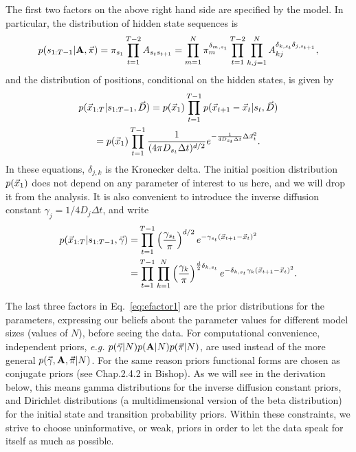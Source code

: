 The first two factors on the above right hand side are specified by
the model. In particular, the distribution of hidden state sequences
is
\begin{equation}\label{smodel1}
  p(s_{1:T-1}|\mathbf{A},\vec{\pi})=\pi_{s_1}\prod_{t=1}^{T-2}A_{s_ts_{t+1}}
  =\prod_{m=1}^N\pi_m^{\delta_{m,s_1}}
  \prod_{t=1}^{T-2}\prod_{k,j=1}^N A_{kj}^{\delta_{k,s_t}\delta_{j,s_{t+1}}},
\end{equation}
and the distribution of positions, conditional on the hidden states, is
given by 
\begin{multline}
  p(\vec{x}_{1:T}|s_{1:T-1},\vec
  D)=p(\vec{x}_1)\prod_{t=1}^{T-1}p(\vec{x}_{t+1}-\vec{x}_t|s_t,\vec D)\\
  =p(\vec{x}_1)\prod_{t=1}^{T-1} \frac{1}{(4\pi D_{s_t}\Delta
  t)^{d/2}}e^{-\frac{1}{4D_{s_t}\Delta t}\Delta\vec{x}_t^2}.
\end{multline}
In these equations, $\delta_{j,k}$ is the Kronecker delta. The initial
position distribution $p(\vec{x}_1)$ does not depend on any parameter of
interest to us here, and we will drop it from the analysis.  It is
also convenient to introduce the inverse diffusion constant
$\gamma_j=1/4D_j\Delta t$, and write
\begin{align}
    p(\vec{x}_{1:T}|s_{1:T-1},\vec\gamma)=&
    \prod_{t=1}^{T-1}\left(\frac{\gamma_{s_t}}{\pi}\right)^{d/2}
    e^{-\gamma_{s_t}(\vec{x}_{t+1}-\vec{x}_t)^2}\nonumber\\
    =&\prod_{t=1}^{T-1}\prod_{k=1}^N\left(
    \frac{\gamma_k}{\pi}\right)^{\frac d2\delta_{k,s_t}}
    e^{-\delta_{k,s_t}\gamma_k(\vec{x}_{t+1}-\vec{x}_t)^2}. 
    \label{xmodel1}
\end{align}

The last three factors in Eq.~\eqref{eq:efactor1} are the prior
distributions for the parameters, expressing our beliefs about the
parameter values for different model sizes (values of $N$), before
seeing the data. For computational convenience, independent
priors, \textit{e.g.}  $p(\vec{\gamma}|N) p(\mathbf{A}|N)
p(\vec\pi|N)$, are used instead of the more general
$p(\vec{\gamma},\mathbf{A},\vec\pi|N)$. For the same reason priors
functional forms are chosen as conjugate priors (see Chap.2.4.2 in
Bishop\cite{Bishop2006}). As we will see in the derivation below, this
means gamma distributions for the inverse diffusion constant priors,
and Dirichlet distributions (a multidimensional version of the beta
distribution) for the initial state and transition probability priors.
Within these constraints, we strive to choose uninformative, or weak,
priors in order to let the data speak for itself as much as possible.

